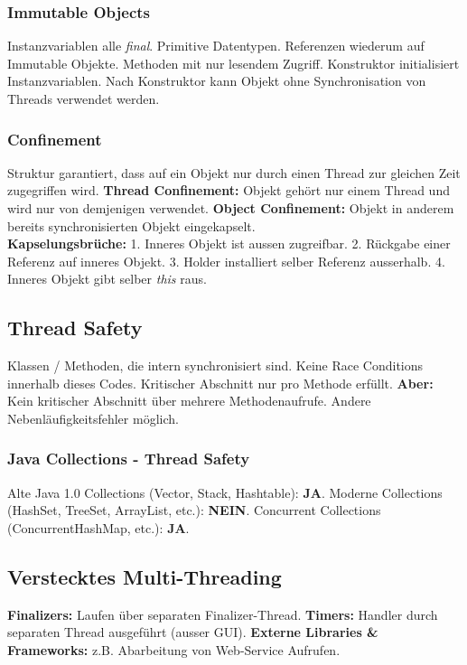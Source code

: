 \subsubsection{Immutable Objects}
Instanzvariablen alle \textit{final}. Primitive Datentypen. Referenzen wiederum auf Immutable Objekte.
Methoden mit nur lesendem Zugriff. Konstruktor initialisiert Instanzvariablen.
Nach Konstruktor kann Objekt ohne Synchronisation von Threads verwendet werden.

\subsubsection{Confinement}
Struktur garantiert, dass auf ein Objekt nur durch einen Thread zur gleichen Zeit zugegriffen wird.
\textbf{Thread Confinement:} Objekt gehört nur einem Thread und wird nur von demjenigen verwendet.
\textbf{Object Confinement:} Objekt in anderem bereits synchronisierten Objekt eingekapselt.\\ 
\textbf{Kapselungsbrüche:} 1. Inneres Objekt ist aussen zugreifbar. 2. Rückgabe einer Referenz auf inneres Objekt.
3. Holder installiert selber Referenz ausserhalb. 4. Inneres Objekt gibt selber \textit{this} raus.


\subsection{Thread Safety}
Klassen / Methoden, die intern synchronisiert sind. Keine Race Conditions innerhalb dieses Codes.
Kritischer Abschnitt nur pro Methode erfüllt.
\textbf{Aber:} Kein kritischer Abschnitt über mehrere Methodenaufrufe. 
Andere Nebenläufigkeitsfehler möglich.

\subsubsection{Java Collections - Thread Safety}
Alte Java 1.0 Collections (Vector, Stack, Hashtable): \textbf{JA}. 
Moderne Collections (HashSet, TreeSet, ArrayList, etc.): \textbf{NEIN}.
Concurrent Collections (ConcurrentHashMap, etc.): \textbf{JA}.

\subsection{Verstecktes Multi-Threading}
\textbf{Finalizers:} Laufen über separaten Finalizer-Thread.
\textbf{Timers:} Handler durch separaten Thread ausgeführt (ausser GUI).
\textbf{Externe Libraries \& Frameworks:} z.B. Abarbeitung von Web-Service Aufrufen.

